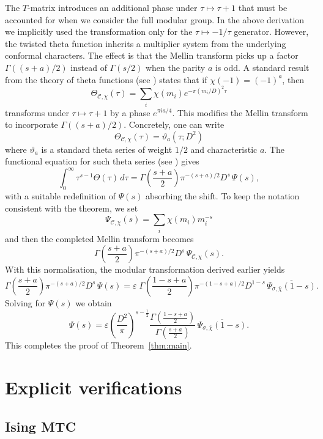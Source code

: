 \documentclass[12pt,a4paper]{article}
\theoremstyle{definition}
\theoremstyle{remark}
\begin{document}
The $T$-matrix introduces an additional phase under $\tau\mapsto\tau+1$ that must
be accounted for when we consider the full modular group. In the above derivation
we implicitly used the transformation only for the $\tau\mapsto-1/\tau$ generator.
However, the twisted theta function inherits a multiplier system from the
underlying conformal characters. The effect is that the Mellin transform picks up
a factor $\Gamma((s+a)/2)$ instead of $\Gamma(s/2)$ when the parity $a$ is odd.
A standard result from the theory of theta functions (see \cite{Mumford}) states
that if $\chi(-1)=(-1)^a$, then
\[
\Theta_{\mathcal{C},\chi}(\tau)
  = \sum_i \chi(m_i) e^{-\pi (m_i/D)^2\tau}
\]
transforms under $\tau\mapsto\tau+1$ by a phase $e^{\pi i a/4}$. This modifies
the Mellin transform to incorporate $\Gamma((s+a)/2)$. Concretely, one can write
\[
\Theta_{\mathcal{C},\chi}(\tau) = \vartheta_{a}(\tau; D^2)
\]
where $\vartheta_a$ is a standard theta series of weight $1/2$ and characteristic
$a$. The functional equation for such theta series (see \cite{IK}) gives
\[
\int_0^\infty\tau^{s-1}\Theta(\tau)\,d\tau
  = \Gamma\!\left(\frac{s+a}{2}\right)\pi^{-(s+a)/2}D^{s}\,\Psi(s),
\]
with a suitable redefinition of $\Psi(s)$ absorbing the shift. To keep the
notation consistent with the theorem, we set
\[
\Psi_{\mathcal{C},\chi}(s) = \sum_i \chi(m_i) m_i^{-s}
\]
and then the completed Mellin transform becomes
\[
\Gamma\!\left(\frac{s+a}{2}\right)\pi^{-(s+a)/2}D^{s}\,
  \Psi_{\mathcal{C},\chi}(s).
\]
With this normalisation, the modular transformation derived earlier yields
\[
\Gamma\!\left(\frac{s+a}{2}\right)\pi^{-(s+a)/2}D^{s}\,\Psi(s)
  = \varepsilon\;\Gamma\!\left(\frac{1-s+a}{2}\right)
    \pi^{-(1-s+a)/2}D^{1-s}\,
    \overline{\Psi_{\sigma,\overline{\chi}}(1-s)}.
\]
Solving for $\Psi(s)$ we obtain
\[
\Psi(s)=\varepsilon\left(\frac{D^2}{\pi}\right)^{s-\frac12}
  \frac{\Gamma\!\left(\frac{1-s+a}{2}\right)}
       {\Gamma\!\left(\frac{s+a}{2}\right)}\,
  \overline{\Psi_{\sigma,\overline{\chi}}(1-s)}.
\]
This completes the proof of Theorem~\ref{thm:main}.


\section{Explicit verifications}

\subsection{Ising MTC}
\end{document}

